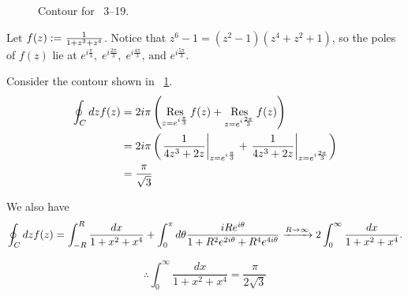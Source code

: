 \item

\begin{figure}[ht]
	\centering
	\caption{Contour for ~3--19.}%
	\label{fig:problem3-19}
\end{figure}

Let $f(z) := \frac{1}{1 + z^2 + z^4}$.
Notice that $z^6 - 1 = \left( z^2 - 1 \right) \left( z^4 + z^2 + 1 \right)$,
so the poles of $f(z)$ lie at
$e^{i\frac{\pi}{3}},\; e^{i\frac{2\pi}{3}},\; e^{i\frac{4\pi}{3}} \text{, and } e^{i\frac{5\pi}{3}}$.

Consider the contour shown in ~\ref{fig:problem3-19}.
\begin{align*}
	\oint_C dz f(z)
	&= 2i\pi \left( \mathop{\mathrm{Res}}_{z=e^{i\frac{\pi}{3}}} f(z) + \mathop{\mathrm{Res}}_{z=e^{i\frac{2\pi}{3}}} f(z) \right) \\
	&= 2i\pi \left( {\left. \frac{1}{4z^3 + 2z} \right|}_{z=e^{i\frac{\pi}{3}}} + {\left. \frac{1}{4z^3 + 2z} \right|}_{z=e^{i\frac{2\pi}{3}}} \right) \\
	&= \frac{\pi}{\sqrt{3}}
\end{align*}

We also have
\[
    \oint_C dz f(z)
    = \int_{-R}^R \frac{dx}{1 + x^2 + x^4}
     + \int_0^\pi d\theta \frac{iRe^{i\theta}}{1 + R^2 e^{2i\theta} + R^4 e^{4i\theta}} \\
    \xrightarrow{R \rightarrow \infty}
     2\int_0^\infty \frac{dx}{1 + x^2 + x^4}.
\]

\[
    \therefore \int_0^\infty \frac{dx}{1 + x^2 + x^4} = \frac{\pi}{2\sqrt{3}}
\]

